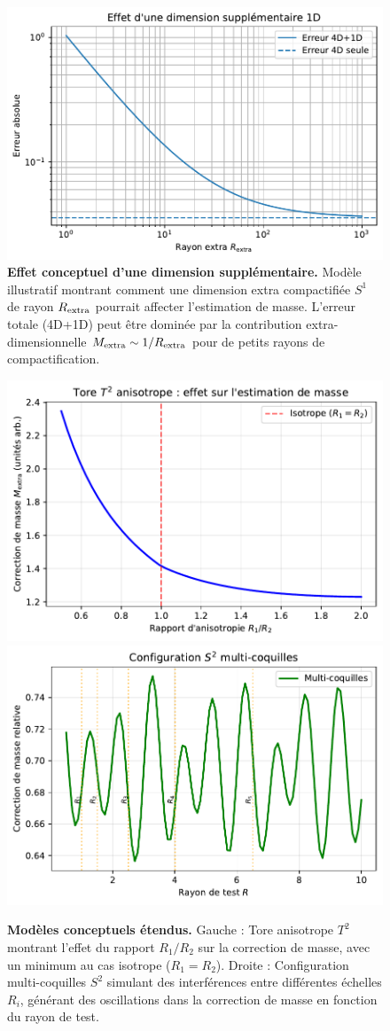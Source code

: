 \documentclass[11pt]{article}
\begin{document}
\begin{figure}[!htb]
\centering
\includegraphics[width=.75\linewidth]{fig_extra_dimension_effect_improved.pdf}
\caption{\textbf{Effet conceptuel d'une dimension supplémentaire.} Modèle illustratif montrant comment une dimension extra compactifiée $S^1$ de rayon $R_{\rm extra}$ pourrait affecter l'estimation de masse. L'erreur totale (4D+1D) peut être dominée par la contribution extra-dimensionnelle $M_{\rm extra} \sim 1/R_{\rm extra}$ pour de petits rayons de compactification.}
\end{figure}

\begin{figure}[!htb]
\centering
\includegraphics[width=.48\linewidth]{fig_torus_anisotropic.pdf}
\includegraphics[width=.48\linewidth]{fig_sphere_multishell.pdf}
\caption{\textbf{Modèles conceptuels étendus.} Gauche : Tore anisotrope $T^2$ montrant l'effet du rapport $R_1/R_2$ sur la correction de masse, avec un minimum au cas isotrope ($R_1=R_2$). Droite : Configuration multi-coquilles $S^2$ simulant des interférences entre différentes échelles $R_i$, générant des oscillations dans la correction de masse en fonction du rayon de test.}
\end{figure}
\clearpage
\end{document}
